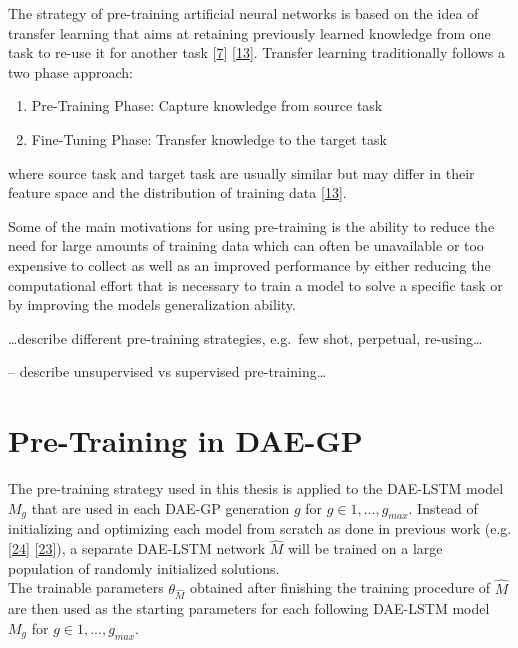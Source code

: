 \documentclass[
  11pt,
]{article}
\providecommand{\tightlist}{%
  \setlength{\itemsep}{0pt}\setlength{\parskip}{0pt}}
\begin{document}
The strategy of pre-training artificial neural networks is based on the idea of transfer learning that aims at retaining previously learned knowledge from one task to re-use it for another task {[}\protect\hyperlink{ref-HAN2021225}{7}{]} {[}\protect\hyperlink{ref-survey_transfer_learning}{13}{]}.
Transfer learning traditionally follows a two phase approach:

\begin{enumerate}
\def\labelenumi{\arabic{enumi}.}
\tightlist
\item
  Pre-Training Phase: Capture knowledge from source task
\item
  Fine-Tuning Phase: Transfer knowledge to the target task
\end{enumerate}

where source task and target task are usually similar but may differ in their feature space and the distribution of training data {[}\protect\hyperlink{ref-survey_transfer_learning}{13}{]}.

Some of the main motivations for using pre-training is the ability to reduce the need for large amounts of training data which can often be unavailable or too expensive to collect as well as an improved performance by either reducing the computational effort that is necessary to train a model to solve a specific task or by improving the models generalization ability.

\ldots describe different pre-training strategies, e.g.~few shot, perpetual, re-using\ldots{}

-- describe unsupervised vs supervised pre-training\ldots{}

\hypertarget{pre-training-in-dae-gp}{%
\section{Pre-Training in DAE-GP}\label{pre-training-in-dae-gp}}

The pre-training strategy used in this thesis is applied to the DAE-LSTM model \(M_g\) that are used in each DAE-GP generation \(g\) for \(g\in{1,...,g_{max}}\).
Instead of initializing and optimizing each model from scratch as done in previous work (e.g. {[}\protect\hyperlink{ref-dae-gp_2020_rtree}{24}{]} {[}\protect\hyperlink{ref-dae-gp_2022_symreg}{23}{]}), a separate DAE-LSTM network \(\hat{M}\) will be trained on a large population of randomly initialized solutions.\\
The trainable parameters \(\theta_{\hat{M}}\) obtained after finishing the training procedure of \(\hat{M}\) are then used as the starting parameters for each following DAE-LSTM model \(M_g\) for \(g\in{1,...,g_{max}}\).
\end{document}
